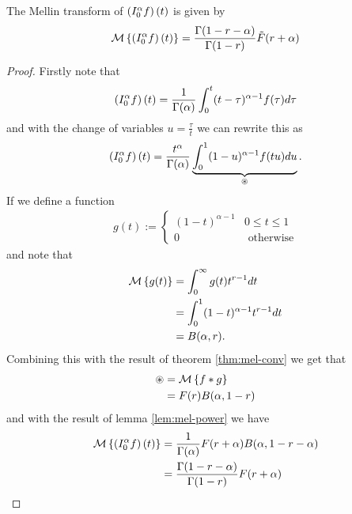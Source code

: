 \documentclass{unswmaths}
\begin{document}
\begin{lemma}
\label{lem:mel-rl-int}
	The Mellin transform of $ \left( I_{0}^{\alpha} f \right)(t) $ is given by
	\begin{align*}
		\mathcal{M} \left\{ \left( I_{0}^{\alpha} f \right)(t) \right\} = \frac{\Gamma(1-r-\alpha)}{\Gamma(1-r)} \tilde{F}(r+\alpha)
	\end{align*}
\end{lemma}
\begin{proof}
	Firstly note that 
	\begin{align*}
		\left( I_{0}^{\alpha} f \right)(t) = \frac{1}{\Gamma(\alpha)} \int_0^t (t-\tau)^{\alpha-1}f(\tau) d\tau
	\end{align*}
	and with the change of variables $ u =\frac{\tau}{t} $ we can rewrite this as 
	\begin{align*}
		\left( I_{0}^{\alpha} f \right)(t) = \frac{t^\alpha}{\Gamma(\alpha)} \underbrace{\int_0^1 (1-u)^{\alpha-1}f(tu) du}_{\circledast}.
	\end{align*}
	If we define a function 
	\begin{align*}
		g(t) :=
		\begin{cases}
			(1-t)^{\alpha-1} & 0 \leq t \leq 1 \\
			0 & \text{ otherwise}
		\end{cases}
	\end{align*}
	and note that
	\begin{align*}
		\mathcal{M} \left\{ g(t) \right\} &= \int_0^\infty g(t) t^{r-1} dt \\
			&= \int_0^1 (1-t)^{\alpha-1}t^{r-1}dt \\
			&= B(\alpha, r).
	\end{align*}
	Combining this with the result of theorem \ref{thm:mel-conv} we get that
	\begin{align*}
		\circledast &= \mathcal{M} \left\{ f*g \right\} \\
			&= F(r)B(\alpha,1-r)
	\end{align*}
	and with the result of lemma \ref{lem:mel-power} we have
	\begin{align*}
		\mathcal{M} \left\{ \left( I_{0}^{\alpha} f \right)(t) \right\} &= \frac{1}{\Gamma(\alpha)} F(r+\alpha)B(\alpha,1-r-\alpha) \\
			&= \frac{\Gamma(1-r-\alpha)}{\Gamma(1-r)}F(r+\alpha)
	\end{align*}
\end{proof}
\end{document}
